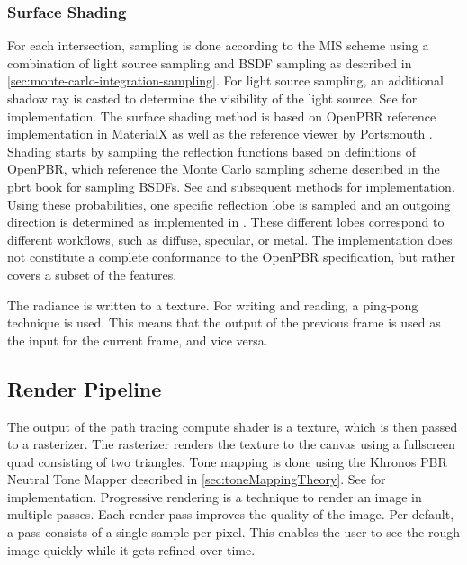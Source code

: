 \subsubsection{Surface Shading}

For each intersection, sampling is done according to the \gls{MIS} scheme using a combination of light source sampling and \gls{BSDF} sampling as described in \autoref{sec:monte-carlo-integration-sampling}. For light source sampling, an additional shadow ray is casted to determine the visibility of the light source. See  for implementation. The surface shading method is based on \gls{OpenPBR} reference implementation in \gls{MaterialX} as well as the reference viewer by Portsmouth \cite{openPbrViewer}. Shading starts by sampling the reflection functions based on definitions of \gls{OpenPBR}, which reference the Monte Carlo sampling scheme described in the \gls{pbrt} book \cite{Pharr_Physically_Based_Rendering_2023} for sampling \glspl{BSDF}. See  and subsequent methods for implementation. Using these probabilities, one specific reflection lobe is sampled and an outgoing direction is determined as implemented in . These different lobes correspond to different workflows, such as diffuse, specular, or metal. The implementation does not constitute a complete conformance to the \gls{OpenPBR} specification, but rather covers a subset of the features.

The radiance is written to a texture. For writing and reading, a ping-pong technique is used. This means that the output of the previous frame is used as the input for the current frame, and vice versa.

\subsection*{Render Pipeline}

The output of the path tracing compute shader is a texture, which is then passed to a rasterizer. The rasterizer renders the texture to the canvas using a fullscreen quad consisting of two triangles. Tone mapping is done using the Khronos \gls{PBR} Neutral Tone Mapper described in \autoref{sec:toneMappingTheory}. See  for implementation. Progressive rendering is a technique to render an image in multiple passes. Each render pass improves the quality of the image. Per default, a pass consists of a single sample per pixel. This enables the user to see the rough image quickly while it gets refined over time.

